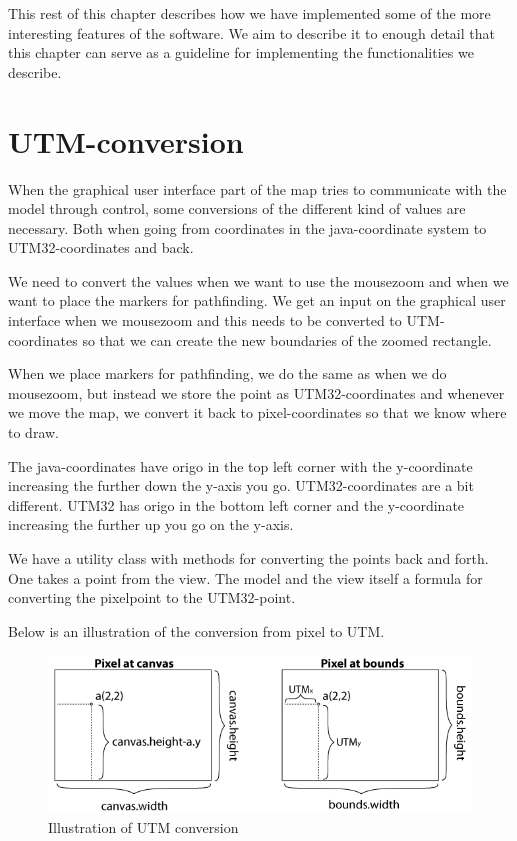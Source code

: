This rest of this chapter describes how we have implemented some of the more
interesting features of the software. We aim to describe it to enough detail that this
chapter can serve as a guideline for implementing the functionalities we
describe.

\section{UTM-conversion}
\label{IMPL-UTM}
When the graphical user interface part of the map tries to communicate with the
model through control, some conversions of the different kind of values are
necessary. Both when going from coordinates in the java-coordinate system to
UTM32-coordinates and back. 

We need to convert the values when we want to use the mousezoom and when we want
to place the markers for pathfinding. We get an input on the graphical user
interface when we mousezoom and this needs to be converted to UTM-coordinates so
that we can create the new boundaries of the zoomed rectangle.

When we place markers for pathfinding, we do the same as when we do mousezoom,
but instead we store the point as UTM32-coordinates and whenever we move the
map, we convert it back to pixel-coordinates so that we know where to draw.

The java-coordinates have origo in the top left corner with the y-coordinate
increasing the further down the y-axis you go. UTM32-coordinates are a bit
different. UTM32 has origo in the bottom left corner and the y-coordinate
increasing the further up you go on the y-axis.

We have a utility class with methods for converting the points back and forth.
One takes a point from the view. The model and the view itself a formula
for converting the pixelpoint to the UTM32-point.

Below is an illustration of the conversion from pixel to UTM.

\begin{figure}[!ht]
\centering
\includegraphics[width=1\linewidth]{images/UTMillu}
\caption{Illustration of UTM conversion}
\label{fig:UTMconversion}
\end{figure}

